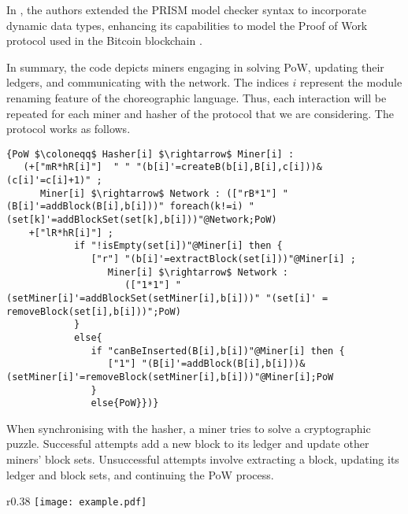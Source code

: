\begin{comment}
\begin{wrapfigure}[11]{r}{4cm}
	\texttt{[image: bitcoin.pdf]}	
\end{wrapfigure} 
\end{comment}
In \cite{DBLP:journals/concurrency/BistarelliNGLMV23}, the authors extended the PRISM model checker syntax to incorporate dynamic data types, enhancing its capabilities to model the Proof of Work protocol used in the Bitcoin blockchain \cite{bitcoin}. 

In summary, the code depicts miners engaging in
  solving PoW, updating their ledgers, and communicating with the
  network.  The indices $i$ represent the module renaming feature of
  the choreographic language. Thus, each interaction will be repeated
  for each miner and hasher of the protocol that we are
  considering. The protocol works as follows. 
  \begin{lstlisting}[style=chor-color,breaklines=true, postbreak=\mbox{\textcolor{red}{$\hookrightarrow$}\space},caption={Choreography for the Proof of Work Bitcoin Protocol},captionpos=b,label={ex3-code}]
   {PoW $\coloneqq$ Hasher[i] $\rightarrow$ Miner[i] :
   (+["mR*hR[i]"]  " " "(b[i]'=createB(b[i],B[i],c[i]))&(c[i]'=c[i]+1)" ; 
      Miner[i] $\rightarrow$ Network : (["rB*1"] "(B[i]'=addBlock(B[i],b[i]))" foreach(k!=i) "(set[k]'=addBlockSet(set[k],b[i]))"@Network;PoW)
    +["lR*hR[i]"] ; 
            if "!isEmpty(set[i])"@Miner[i] then { 
               ["r"] "(b[i]'=extractBlock(set[i]))"@Miner[i] ;  
                  Miner[i] $\rightarrow$ Network : 
                     (["1*1"] "(setMiner[i]'=addBlockSet(setMiner[i],b[i]))" "(set[i]' = removeBlock(set[i],b[i]))";PoW) 
            }
            else{
               if "canBeInserted(B[i],b[i])"@Miner[i] then { 
                  ["1"] "(B[i]'=addBlock(B[i],b[i]))&(setMiner[i]'=removeBlock(setMiner[i],b[i]))"@Miner[i];PoW 
               }
               else{PoW}})} 
   \end{lstlisting}
   \vspace{-0.15cm}
  When synchronising with
  the hasher, a miner tries to solve a cryptographic
  puzzle. Successful attempts add a new block to its ledger and update other miners' block sets. Unsuccessful attempts involve extracting a block, updating its ledger and block sets, and continuing the PoW process.
  \begin{wrapfigure}{r}{0.38\textwidth}
   \vspace{-0.75cm}
   \centering
   \texttt{[image: example.pdf]}	
   \vspace{-0.35cm}
   \caption{}
   \label{ex3-res}
   \vspace{-0.75cm}
\end{wrapfigure}
